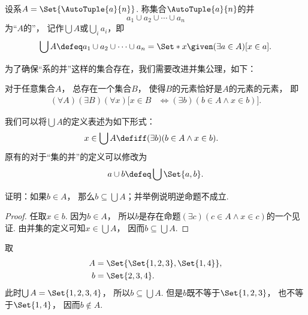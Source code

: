 \begin{definition}
设系\(A = \Set{\AutoTuple{a}{n}}\).
称集合\(\AutoTuple{a}{n}\)的并\begin{equation*}
	a_1 \cup a_2 \cup \dotsb \cup a_n
\end{equation*}为“\(A\)的”，
记作\(\bigcup A\)或\(\bigcup_i a_i\)，即\begin{equation*}
	\bigcup A
	\defeq
	a_1 \cup a_2 \cup \dotsb \cup a_n
	= \Set*{ x \given (\exists a \in A)[x \in a] }.
\end{equation*}
\end{definition}

为了确保“系的并”这样的集合存在，我们需要改进并集公理，如下：
\begin{axiom}[并集公理II]
    对于任意集合\(A\)，
    总存在一个集合\(B\)，
    使得\(B\)的元素恰好是\(A\)的元素的元素，
    即
    \begin{align*}
        (\forall A)(\exists B)(\forall x)
        [x\in B &\iff (\exists b)(b\in A\land x\in b)].
    \end{align*}
\end{axiom}

我们可以将\(\bigcup A\)的定义表述为如下形式：
\begin{align*}
    x\in\bigcup A &\defiff (\exists b)(b\in A\land x\in b).
\end{align*}
原有的对于“集的并”的定义可以修改为\begin{equation*}
	a \cup b \defeq \bigcup\Set{a,b}.
\end{equation*}

\begin{example}
    证明：如果\(b\in A\)，
    那么\(b\subseteq\bigcup A\)；并举例说明逆命题不成立.
    \begin{proof}
        任取\(x\in b\).
        因为\(b\in A\)，
        所以\(b\)是存在命题\((\exists c)(c\in A\land x\in c)\)的一个见证.
        由并集的定义可知\(x\in\bigcup A\)，
        因而\(b\subseteq\bigcup A\).
    \end{proof}
    \begin{solution}
        取
        \begin{align*}
            A &= \Set{\Set{1,2,3},\Set{1,4}}, \\
            b &= \Set{2,3,4}.
        \end{align*}
        此时\(\bigcup A=\Set{1,2,3,4}\)，
        所以\(b\subseteq\bigcup A\).
        但是\(b\)既不等于\(\Set{1,2,3}\)，
        也不等于\(\Set{1,4}\)，
        因而\(b\notin A\).
    \end{solution}
\end{example}

